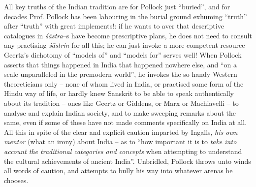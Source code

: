 {{All key truths of the Indian tradition are for Pollock just “buried”, and for decades Prof. Pollock has been labouring in the burial ground exhuming “truth” after “truth” with great implements!: if he wants to aver that descriptive catalogues in \textit{śāstra}–s have become prescriptive plans, he does not need to consult any practising \textit{śāstrin} for all this; he can just invoke a more competent resource – Geertz’s dichotomy of “models of” and “models for” serves well! When Pollock asserts that things happened in India that happened nowhere else, and “on a scale unparalleled in the premodern world”, he invokes the so handy Western theoreticians only – none of whom lived in India, or practised some form of the Hindu way of life, or hardly knew Sanskrit to be able to speak authentically about its tradition – ones like Geertz or Giddens, or Marx or Machiavelli – to analyse and explain Indian society, and to make sweeping remarks about the same, even if some of these have not made comments specifically on India at all. All this in spite of the clear and explicit caution imparted by Ingalls, \textit{his own mentor} (what an irony) about India – as to “how important it is to \textit{take into account the traditional categories and concepts} when attempting to understand the cultural achievements of ancient India”. Unbridled, Pollock throws unto winds all words of caution, and attempts to bully his way into whatever arenas he chooses.

}}
